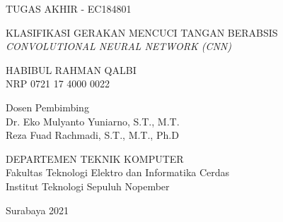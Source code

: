 TUGAS AKHIR - EC184801

\vspace{6ex}

\begin{large}
  KLASIFIKASI GERAKAN MENCUCI TANGAN BERABSIS \emph{CONVOLUTIONAL NEURAL NETWORK (CNN)}
\end{large}

\vspace{4ex}

HABIBUL RAHMAN QALBI \\
NRP 0721 17 4000 0022

\vspace{2ex}

Dosen Pembimbing \\
Dr. Eko Mulyanto Yuniarno, S.T., M.T. \\
Reza Fuad Rachmadi, S.T., M.T., Ph.D

\vspace{6ex}

DEPARTEMEN TEKNIK KOMPUTER \\
Fakultas Teknologi Elektro dan Informatika Cerdas\\
Institut Teknologi Sepuluh Nopember

Surabaya 2021
